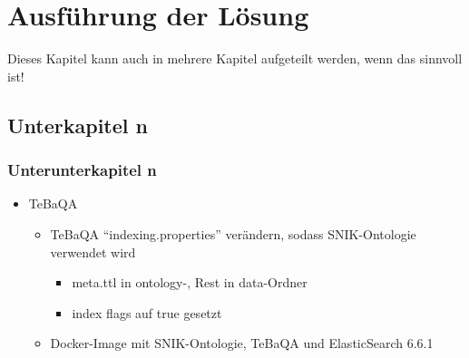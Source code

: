 \chapter{Ausführung der Lösung}\label{ch:solution}
Dieses Kapitel kann auch in mehrere Kapitel aufgeteilt werden, wenn das sinnvoll ist!

\section{Unterkapitel n}

\subsection{Unterunterkapitel n}

\begin{itemize}
  \item{TeBaQA}
  \begin{itemize}
    \item TeBaQA \enquote{indexing.properties} verändern, sodass SNIK-Ontologie verwendet wird
    \begin{itemize}
      \item meta.ttl in ontology-, Rest in data-Ordner
      \item index flags auf true gesetzt
    \end{itemize}
    \item Docker-Image mit SNIK-Ontologie, TeBaQA und ElasticSearch 6.6.1
  \end{itemize}

\end{itemize}
